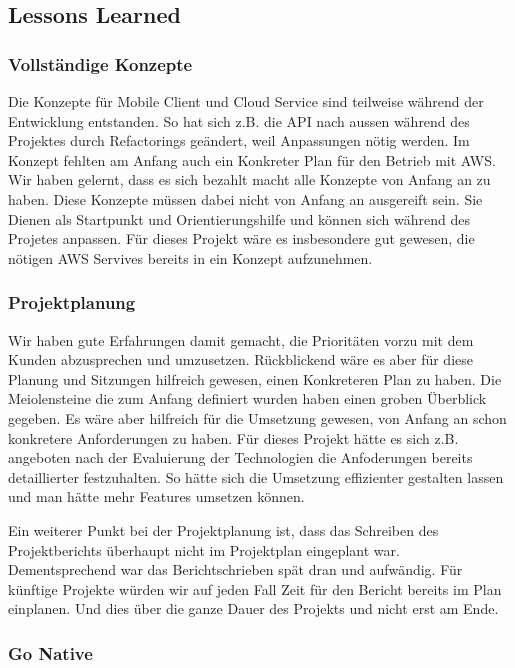 \subsection{Lessons Learned}

\subsubsection*{Vollständige Konzepte}

Die Konzepte für Mobile Client und Cloud Service sind teilweise während der Entwicklung entstanden.
So hat sich z.B. die API nach aussen während des Projektes durch Refactorings geändert, weil Anpassungen nötig werden.
Im Konzept fehlten am Anfang auch ein Konkreter Plan für den Betrieb mit AWS.
Wir haben gelernt, dass es sich bezahlt macht alle Konzepte von Anfang an zu haben.
Diese Konzepte müssen dabei nicht von Anfang an ausgereift sein.
Sie Dienen als Startpunkt und Orientierungshilfe und können sich während des Projetes anpassen.
Für dieses Projekt wäre es insbesondere gut gewesen, die nötigen AWS Servives bereits in ein Konzept aufzunehmen.

\subsubsection*{Projektplanung}

Wir haben gute Erfahrungen damit gemacht, die Prioritäten vorzu mit dem Kunden abzusprechen und umzusetzen.
Rückblickend wäre es aber für diese Planung und Sitzungen hilfreich gewesen, einen Konkreteren Plan zu haben.
Die Meiolensteine die zum Anfang definiert wurden haben einen groben Überblick gegeben.
Es wäre aber hilfreich für die Umsetzung gewesen, von Anfang an schon konkretere Anforderungen zu haben.
Für dieses Projekt hätte es sich z.B. angeboten nach der Evaluierung der Technologien die Anfoderungen bereits detaillierter festzuhalten.
So hätte sich die Umsetzung effizienter gestalten lassen und man hätte mehr Features umsetzen können.

Ein weiterer Punkt bei der Projektplanung ist, dass das Schreiben des Projektberichts überhaupt nicht im Projektplan eingeplant war.
Dementsprechend war das Berichtschrieben spät dran und aufwändig.
Für künftige Projekte würden wir auf jeden Fall Zeit für  den Bericht bereits im Plan einplanen.
Und dies über die ganze Dauer des Projekts und nicht erst am Ende.

\subsubsection*{Go Native}

